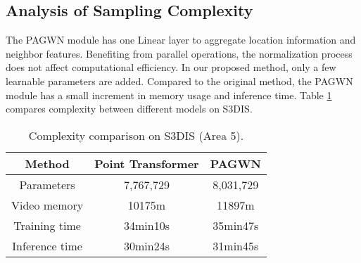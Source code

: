 \documentclass[10pt,twocolumn,letterpaper]{article}
\begin{document}
    \subsection{Analysis of Sampling Complexity}

        The PAGWN module has one Linear layer to aggregate location information and neighbor features. Benefiting from parallel operations, the normalization process does not affect computational efficiency. In our proposed method, only a few learnable parameters are added. Compared to the original method, the PAGWN module has a small increment in memory usage and inference time. Table \ref{tab:5} compares complexity between different models on S3DIS.
        \begin{table}[!htb]\centering
          \setlength{\tabcolsep}{3mm}
            \renewcommand\arraystretch{1.1}
         \caption{Complexity comparison on S3DIS (Area 5).}
        \begin{tabular}{c|cc}
        \toprule
        Method                           & Point Transformer & PAGWN     \\ \hline
        Parameters       & 7,767,729        & 8,031,729 \\
        Video memory & 10175m           & 11897m    \\
        Training time  & 34min10s         & 35min47s  \\
        Inference time      & 30min24s         & 31min45s  \\
        \bottomrule
        \end{tabular}
        \label{tab:5}
        \end{table}
\end{document}
